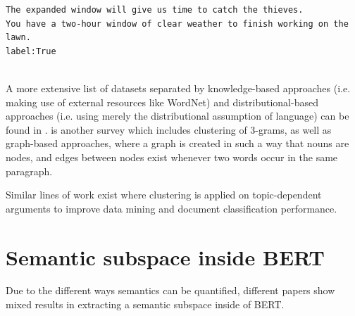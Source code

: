 \documentclass[a4paper,12pt,twoside,openright]{report}
\begin{document}
\begin{verbatim}
The expanded window will give us time to catch the thieves.
You have a two-hour window of clear weather to finish working on the lawn.
label:True
\end{verbatim} \\

A more extensive list of datasets separated by knowledge-based approaches (i.e. making use of external resources like WordNet) and distributional-based approaches (i.e. using merely the distributional assumption of language) can be found in \cite{navigli19}.
\cite{denkowski09} is another survey which includes clustering of 3-grams, as well as graph-based approaches, where a graph is created in such a way that nouns are nodes, and edges between nodes exist whenever two words occur in the same paragraph.

Similar lines of work exist where clustering is applied on topic-dependent arguments \cite{reimers19} to improve data mining and document classification performance.

\section{Semantic subspace inside BERT}

Due to the different ways semantics can be quantified, different papers show mixed results in extracting a semantic subspace inside of BERT.
\end{document}
